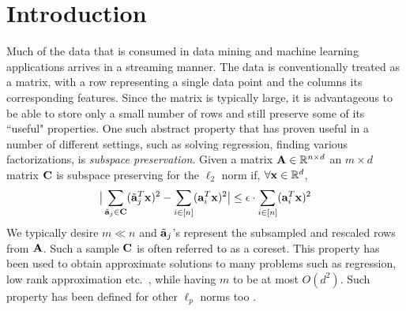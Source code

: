 \section{Introduction}
Much of the data that is consumed in data mining and machine learning applications arrives in a streaming manner. The data is conventionally treated as a matrix, with a row representing a single data point and the columns its corresponding features. Since the matrix is typically large, it is advantageous to be able to store only a small number of rows and still preserve some of its ``useful" properties. One such abstract property that has proven useful in a number of different settings, such as solving regression, finding various factorizations, is {\em subspace preservation}. Given a matrix $\mathbf{A} \in \mathbb{R}^{n \times d}$ an $m \times d$ matrix $\mathbf{C}$ is subspace preserving for the $\ell_2$ norm if, $\forall \mathbf{x} \in \mathbb{R}^{d}$,
\begin{align*}
    \big| \sum_{\tilde{\mathbf{a}}_{j} \in \mathbf{C}}(\tilde{\mathbf{a}}_{j}^T \mathbf{x})^2 - \sum_{i \in [n]}(\mathbf{a}_{i}^T \mathbf{x})^2\big|\leq\epsilon \cdot \sum_{i \in [n]}(\mathbf{a}_{i}^T \mathbf{x})^2
\end{align*}
We typically desire $m \ll n$ and $\tilde{\mathbf{a}}_{j}$'s represent the subsampled and rescaled rows from $\mathbf{A}$. Such a sample $\mathbf{C}$ is often referred to as a coreset.
This property has been used to obtain approximate solutions to many problems such as regression, low rank approximation etc.~\cite{woodruff2014sketching}, while having $m$ to be at most $O(d^2)$. Such property has been defined for other $\ell_p$ norms too \cite{dasgupta2009sampling,cohen2015p,clarkson2016fast}. 

